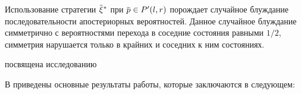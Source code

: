 Использование стратегии $\xiv^*$ при $\p \in P'(l, r)$ порождает случайное блуждание последовательности апостериорных вероятностей.
Данное случайное блуждание симметрично с вероятностями перехода в соседние состояния равными $1/2$, симметрия нарушается только в крайних и соседних к ним состояниях.

 посвящена исследованию 

В  приведены основные результаты работы, которые заключаются в следующем:





